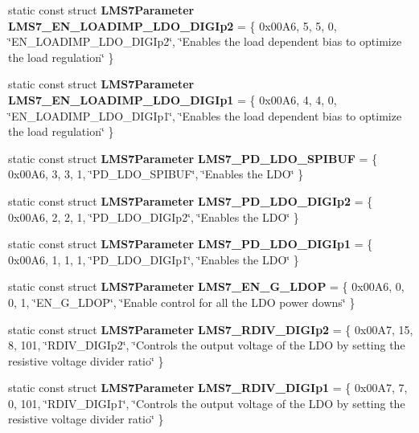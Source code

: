 \begin{DoxyCompactItemize}
\item 
static const struct {\bf L\+M\+S7\+Parameter} {\bf L\+M\+S7\+\_\+\+E\+N\+\_\+\+L\+O\+A\+D\+I\+M\+P\+\_\+\+L\+D\+O\+\_\+\+D\+I\+G\+Ip2} = \{ 0x00\+A6, 5, 5, 0, \char`\"{}\+E\+N\+\_\+\+L\+O\+A\+D\+I\+M\+P\+\_\+\+L\+D\+O\+\_\+\+D\+I\+G\+Ip2\char`\"{}, \char`\"{}\+Enables the load dependent bias to optimize the load regulation\char`\"{} \}
\item 
static const struct {\bf L\+M\+S7\+Parameter} {\bf L\+M\+S7\+\_\+\+E\+N\+\_\+\+L\+O\+A\+D\+I\+M\+P\+\_\+\+L\+D\+O\+\_\+\+D\+I\+G\+Ip1} = \{ 0x00\+A6, 4, 4, 0, \char`\"{}\+E\+N\+\_\+\+L\+O\+A\+D\+I\+M\+P\+\_\+\+L\+D\+O\+\_\+\+D\+I\+G\+Ip1\char`\"{}, \char`\"{}\+Enables the load dependent bias to optimize the load regulation\char`\"{} \}
\item 
static const struct {\bf L\+M\+S7\+Parameter} {\bf L\+M\+S7\+\_\+\+P\+D\+\_\+\+L\+D\+O\+\_\+\+S\+P\+I\+B\+UF} = \{ 0x00\+A6, 3, 3, 1, \char`\"{}\+P\+D\+\_\+\+L\+D\+O\+\_\+\+S\+P\+I\+B\+U\+F\char`\"{}, \char`\"{}\+Enables the L\+D\+O\char`\"{} \}
\item 
static const struct {\bf L\+M\+S7\+Parameter} {\bf L\+M\+S7\+\_\+\+P\+D\+\_\+\+L\+D\+O\+\_\+\+D\+I\+G\+Ip2} = \{ 0x00\+A6, 2, 2, 1, \char`\"{}\+P\+D\+\_\+\+L\+D\+O\+\_\+\+D\+I\+G\+Ip2\char`\"{}, \char`\"{}\+Enables the L\+D\+O\char`\"{} \}
\item 
static const struct {\bf L\+M\+S7\+Parameter} {\bf L\+M\+S7\+\_\+\+P\+D\+\_\+\+L\+D\+O\+\_\+\+D\+I\+G\+Ip1} = \{ 0x00\+A6, 1, 1, 1, \char`\"{}\+P\+D\+\_\+\+L\+D\+O\+\_\+\+D\+I\+G\+Ip1\char`\"{}, \char`\"{}\+Enables the L\+D\+O\char`\"{} \}
\item 
static const struct {\bf L\+M\+S7\+Parameter} {\bf L\+M\+S7\+\_\+\+E\+N\+\_\+\+G\+\_\+\+L\+D\+OP} = \{ 0x00\+A6, 0, 0, 1, \char`\"{}\+E\+N\+\_\+\+G\+\_\+\+L\+D\+O\+P\char`\"{}, \char`\"{}\+Enable control for all the L\+D\+O power downs\char`\"{} \}
\item 
static const struct {\bf L\+M\+S7\+Parameter} {\bf L\+M\+S7\+\_\+\+R\+D\+I\+V\+\_\+\+D\+I\+G\+Ip2} = \{ 0x00\+A7, 15, 8, 101, \char`\"{}\+R\+D\+I\+V\+\_\+\+D\+I\+G\+Ip2\char`\"{}, \char`\"{}\+Controls the output voltage of the L\+D\+O by setting the resistive voltage divider ratio\char`\"{} \}
\item 
static const struct {\bf L\+M\+S7\+Parameter} {\bf L\+M\+S7\+\_\+\+R\+D\+I\+V\+\_\+\+D\+I\+G\+Ip1} = \{ 0x00\+A7, 7, 0, 101, \char`\"{}\+R\+D\+I\+V\+\_\+\+D\+I\+G\+Ip1\char`\"{}, \char`\"{}\+Controls the output voltage of the L\+D\+O by setting the resistive voltage divider ratio\char`\"{} \}

\end{DoxyCompactItemize}
